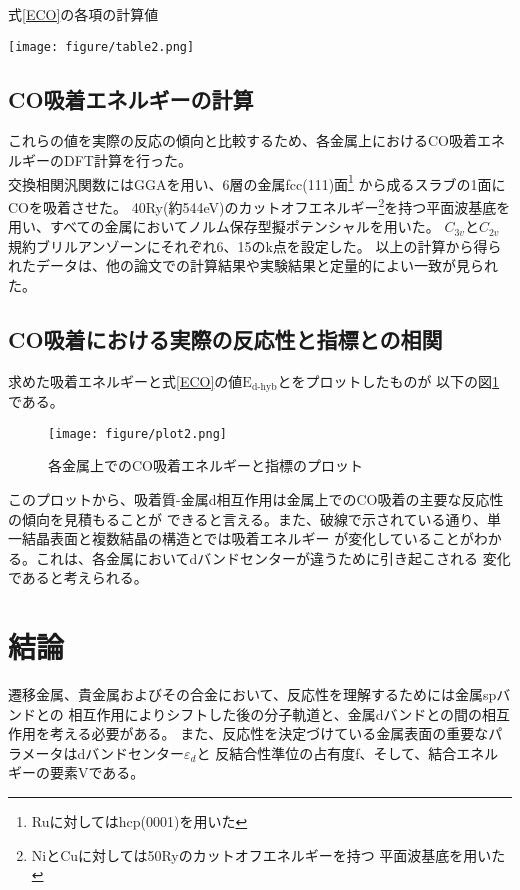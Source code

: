 \documentclass[12pt]{ltjsarticle}
\begin{document}
\begin{table}[hbtp]
    \begin{center}
    \caption{式\ref{ECO}の各項の計算値}
     \texttt{[image: figure/table2.png]}
    \end{center}
    \label{table2}
\end{table}

\subsection{CO吸着エネルギーの計算}
これらの値を実際の反応の傾向と比較するため、各金属上におけるCO吸着エネルギーのDFT計算を行った。\\
交換相関汎関数にはGGAを用い、6層の金属fcc(111)面\footnote{Ruに対してはhcp(0001)を用いた}
から成るスラブの1面にCOを吸着させた。
40Ry(約544eV)のカットオフエネルギー\footnote{NiとCuに対しては50Ryのカットオフエネルギーを持つ
平面波基底を用いた}を持つ平面波基底を用い、すべての金属においてノルム保存型擬ポテンシャルを用いた。
$C_{3v}$と$C_{2v}$規約ブリルアンゾーンにそれぞれ6、15のk点を設定した。
以上の計算から得られたデータは、他の論文での計算結果や実験結果と定量的によい一致が見られた。

\subsection{CO吸着における実際の反応性と指標との相関}
求めた吸着エネルギーと式\ref{ECO}の値$\text{E}_\text{d-hyb}$とをプロットしたものが
以下の図\ref{fig:coplot}である。

\begin{figure}[hbtp]
    \begin{center}
     \texttt{[image: figure/plot2.png]}
    \end{center}
    \caption{各金属上でのCO吸着エネルギーと指標のプロット}
    \label{fig:coplot}
\end{figure}

このプロットから、吸着質-金属d相互作用は金属上でのCO吸着の主要な反応性の傾向を見積もることが
できると言える。また、破線で示されている通り、単一結晶表面と複数結晶の構造とでは吸着エネルギー
が変化していることがわかる。これは、各金属においてdバンドセンターが違うために引き起こされる
変化であると考えられる。

\section{結論}
遷移金属、貴金属およびその合金において、反応性を理解するためには金属spバンドとの
相互作用によりシフトした後の分子軌道と、金属dバンドとの間の相互作用を考える必要がある。
また、反応性を決定づけている金属表面の重要なパラメータはdバンドセンター$\varepsilon_d$と
反結合性準位の占有度f、そして、結合エネルギーの要素Vである。



\end{document}
